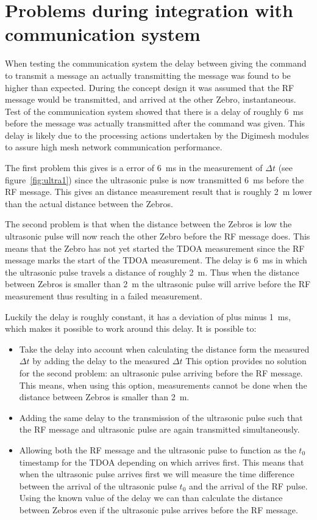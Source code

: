 \section{Problems during integration with communication system}
\label{sec:delay}
When testing the communication system the delay between giving the command to transmit a message an actually transmitting the message was found to be higher than expected.
During the concept design it was assumed that the RF message would be transmitted, and arrived at the other Zebro, instantaneous.
Test of the communication system showed that there is a delay of roughly \SI{6}{\milli\second} before the message was actually transmitted after the command was given.
This delay is likely due to the processing actions undertaken by the Digimesh modules to assure high mesh network communication performance.

The first problem this gives is a error of \SI{6}{\milli\second} in the measurement of $\Delta t$ (see figure~\ref{fig:ultra1}) since the ultrasonic pulse is now transmitted \SI{6}{\milli\second} before the RF message.
This gives an distance measurement result that is roughly \SI{2}{\meter} lower than the actual distance between the Zebros.

The second problem is that when the distance between the Zebros is low the ultrasonic pulse will now reach the other Zebro before the RF message does.
This means that the Zebro has not yet started the TDOA measurement since the RF message marks the start of the TDOA measurement.
The delay is \SI{6}{\milli\second} in which the ultrasonic pulse travels a distance of roughly \SI{2}{\meter}.
Thus when the distance between Zebros is smaller than \SI{2}{\meter} the ultrasonic pulse will arrive before the RF measurement thus resulting in a failed measurement.

Luckily the delay is roughly constant, it has a deviation of plus minus \SI{1}{\milli\second}, which makes it possible to work around this delay.
It is possible to:

\begin{itemize}
\item
Take the delay into account when calculating the distance form the measured $\Delta t$ by adding the delay to the measured $\Delta t$
This option provides no solution for the second problem: an ultrasonic pulse arriving before the RF message.
This means, when using this option, measurements cannot be done when the distance between Zebros is smaller than \SI{2}{\meter}.
\item
Adding the same delay to the transmission of the ultrasonic pulse such that the RF message and ultrasonic pulse are again transmitted simultaneously.
\item
Allowing both the RF message and the ultrasonic pulse to function as the $t_{0}$ timestamp for the TDOA depending on which arrives first.
This means that when the ultrasonic pulse arrives first we will measure the time difference between the arrival of the ultrasonic pulse $t_{0}$ and the arrival of the RF pulse.
Using the known value of the delay we can than calculate the distance between Zebros even if the ultrasonic pulse arrives before the RF message.
\end{itemize}

